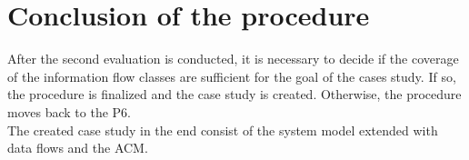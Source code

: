 \section{Conclusion of the procedure}
After the second evaluation is conducted, it is necessary to decide if the coverage of the information flow classes are sufficient for the goal of the cases study. If so, the procedure is finalized and the case study is created. Otherwise, the procedure moves back to the P6.\\ The created case study in the end consist of the system model extended with data flows and the ACM.
%
%
